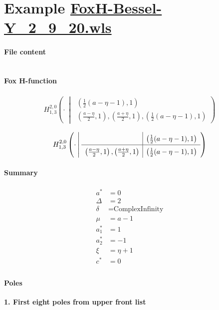 \documentclass[11pt]{article}
\newcommand{\FoxH}[5]{H_{#2}^{#1}\left(#3\:\middle\vert\: \begin{array}{l}#4\\[0.4em] #5\end{array}\right)}
\begin{document}
\section{Example \url{FoxH-Bessel-Y_2_9_20.wls}}

\paragraph{File content}

\inputminted{text}{FoxH-Bessel-Y_2_9_20.wls}

\paragraph{Fox H-function}

\begin{align*}
  \FoxH
    {2,0}
    {1,3}
    {\cdot}
    {\left(\frac{1}{2} (a-\eta -1), 1\right)}
    {\left(\frac{a-\eta }{2}, 1\right), \left(\frac{a+\eta }{2}, 1\right), \left(\frac{1}{2} (a-\eta -1), 1\right)}
\end{align*}

\begin{align*}
  \FoxHext
    {2,0}
    {1,3}
    {\cdot}
    {}
    {\left(\frac{1}{2} (a-\eta -1), 1\right)}
    {\left(\frac{a-\eta }{2}, 1\right), \left(\frac{a+\eta }{2}, 1\right)}
    {\left(\frac{1}{2} (a-\eta -1), 1\right)}
\end{align*}

\paragraph{Summary}

\begin{align*}
  a^*    & = 0 \\
  \Delta & = 2 \\
  \delta & = \text{ComplexInfinity} \\
  \mu    & = a-1 \\
  a_1^*  & = 1 \\
  a_2^*  & = -1 \\
  \xi    & = \eta +1 \\
  c^*    & = 0 \\
\end{align*}

\paragraph{Poles}

\noindent\textbf{1. First eight poles from upper front list}
\end{document}
